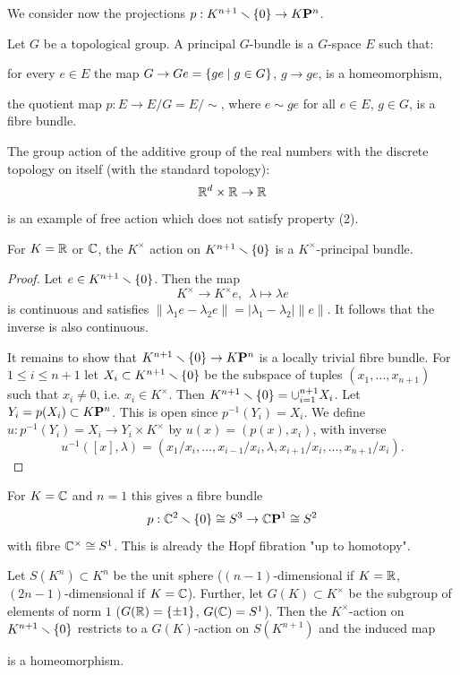 We consider now the projections $p:K^{n+1}\smallsetminus\{0\}\to{K\mathbf{P}^n}$.

Let $G$ be a topological group. A principal $G$-bundle is a $G$-space $E$ such that:
\begin{numerate}
    \item for every $e\in E$ the map $G\to Ge=\{ge\mid g\in G\}$, $g\to ge$, is a homeomorphism,
    \item the quotient map $p:E\to E/G=E/\sim$, where $e\sim ge$ for all $e\in E$, $g\in G$, is a fibre bundle.
\end{numerate}

\begin{example}
The group action of the additive group of the real numbers with the discrete topology on itself (with the standard topology):
\[{\mathbb R}^d\times{\mathbb R}\to{\mathbb R}\]
is an example of free action which does not satisfy property (2).
\end{example}

\begin{proposition}
 For $K={\mathbb R}$ or $\mathbb{C}$, the $K^\times$ action on $K^{n+1}\smallsetminus\{0\}$ is a $K^\times$-principal bundle.
\end{proposition}

\begin{proof}
Let $e\in K^{n+1}\smallsetminus\{0\}$. Then the map
\[K^\times\to K^\times e,\ \ \lambda\mapsto\lambda e\]
is continuous and satisfies $\|\lambda_1 e-\lambda_2 e\|=|\lambda_1-\lambda_2|\|e\|$. It follows that the inverse is also continuous.

It remains to show that $K^{n+1}\smallsetminus\{0\}\to {K\mathbf{P}^n}$ is a locally trivial fibre bundle. For $1\leq i\leq n+1$ let $X_i\subset K^{n+1}\smallsetminus\{0\}$ be the subspace of tuples $(x_1,\dots,x_{n+1})$ such that $x_i\neq 0$, i.e. $x_i\in K^\times$. Then $K^{n+1}\smallsetminus\{0\}=\cup_{i=1}^{n+1}X_i$. Let $Y_i=p(X_i)\subset {K\mathbf{P}^n}$. This is open since $p^{-1}(Y_i)=X_i$. We define $u:p^{-1}(Y_i)=X_i\to Y_i\times K^\times$ by $u(x)=(p(x),x_i)$, with inverse
\[u^{-1}([x],\lambda)=(x_1/x_i,\dots,x_{i-1}/x_i,\lambda,x_{i+1}/x_i,\dots,x_{n+1}/x_i).\]
\end{proof}

For $K=\mathbb{C}$ and $n=1$ this gives a fibre bundle
\[p:\mathbb{C}^2\smallsetminus\{0\}\cong S^3\to {\mathbb{C}\mathbf{P}^{1}}\cong S^2\]
with fibre $\mathbb{C}^\times\cong S^1$. This is already the Hopf fibration "up to homotopy".

Let $S(K^n)\subset K^n$ be the unit sphere ($(n-1)$-dimensional if $K={\mathbb R}$, $(2n-1)$-dimensional if $K=\mathbb{C}$). Further, let $G(K)\subset K^\times$ be the subgroup of elements of norm $1$ ($G({\mathbb R})=\{\pm1\}$, $G(\mathbb{C})=S^1$). Then the $K^\times$-action on $K^{n+1}\smallsetminus\{0\}$ restricts to a $G(K)$-action on $S(K^{n+1})$ and the induced map
\begin{center}
\end{center}
is a homeomorphism.

